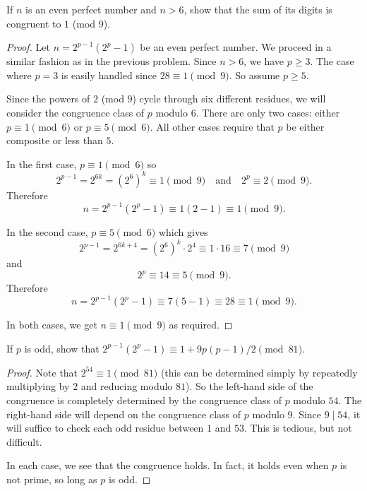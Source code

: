  If $n$ is an even perfect number and $n > 6$, show that
the sum of its digits is congruent to $1$ (mod $9$).
\begin{proof}
  Let $n = 2^{p-1}(2^p - 1)$ be an even perfect number. We proceed in
  a similar fashion as in the previous problem. Since $n > 6$, we have
  $p\geq3$. The case where $p = 3$ is easily handled since
  $28\equiv1\pmod9$. So assume $p\geq5$.

  Since the powers of $2$ (mod $9$) cycle through six different
  residues, we will consider the congruence class of $p$ modulo
  $6$. There are only two cases: either $p\equiv1\pmod6$ or
  $p\equiv5\pmod6$. All other cases require that $p$ be either
  composite or less than $5$.

  In the first case, $p\equiv1\pmod6$ so
  \begin{equation*}
    2^{p-1} = 2^{6k} = (2^6)^k\equiv1\pmod9
    \quad\text{and}\quad
    2^p \equiv 2\pmod9.
  \end{equation*}
  Therefore
  \begin{equation*}
    n = 2^{p-1}(2^p-1) \equiv 1(2 - 1) \equiv 1\pmod9.
  \end{equation*}

  In the second case, $p\equiv5\pmod6$ which gives
  \begin{equation*}
    2^{p-1} = 2^{6k + 4} = (2^6)^k\cdot2^4 \equiv 1\cdot16 \equiv 7\pmod9
  \end{equation*}
  and
  \begin{equation*}
    2^p \equiv 14\equiv 5\pmod 9.
  \end{equation*}
  Therefore
  \begin{equation*}
    n = 2^{p-1}(2^p-1) \equiv 7(5 - 1) \equiv 28 \equiv 1\pmod9.
  \end{equation*}

  In both cases, we get $n\equiv1\pmod9$ as required.
\end{proof}

 If $p$ is odd, show that
$2^{p-1}(2^p - 1)\equiv1 + 9p(p-1)/2\pmod{81}$.
\begin{proof}
  Note that $2^{54}\equiv1\pmod{81}$ (this can be determined simply by
  repeatedly multiplying by $2$ and reducing modulo $81$). So the
  left-hand side of the congruence is completely determined by the
  congruence class of $p$ modulo $54$. The right-hand side will depend
  on the congruence class of $p$ modulo $9$. Since $9\mid54$, it will
  suffice to check each odd residue between $1$ and $53$. This is
  tedious, but not difficult.

  In each case, we see that the congruence holds. In fact, it holds
  even when $p$ is not prime, so long as $p$ is odd.
\end{proof}
